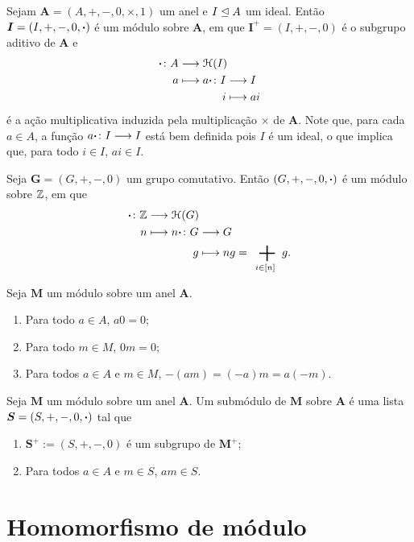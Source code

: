 \begin{example}
Sejam $\bm A=(A,+,-,0,\times,1)$ um anel e $I \mathrel{\unlhd} A$ um ideal. Então $\bm I = (I,+,-,0,\bm{\cdot})$ é um módulo sobre $\bm A$, em que $\bm I^+ = (I,+,-,0)$ é o subgrupo aditivo de $\bm A$ e
	\begin{align*}
	\func{\pt}{A}{\Homo(I)}{a}{
		\begin{aligned}[t]
			\func{a \pt}{I}{I}{i}{ai}
		\end{aligned}
	}
	\end{align*}
é a ação multiplicativa induzida pela multiplicação $\times$ de $\bm A$. Note que, para cada $a \in A$, a função ${a \bm{\cdot}}\colon {I} \longrightarrow {I}$ está bem definida pois $I$ é um ideal, o que implica que, para todo $i \in I$, $ai \in I$.
\end{example}
	
\begin{example}
Seja $\bm G=(G,+,-,0)$ um grupo comutativo. Então $(G,+,-,0,\bm{\cdot})$ é um módulo sobre $\mathbb{Z}$, em que
	\begin{align*}
	\func{\pt}{\Z}{\Homo(G)}{n}{
		\begin{aligned}[t]
			\func{n \pt}{G}{G}{g}{ng=\sum_{i \in [n]} g}.
		\end{aligned}
	}
	\end{align*}
\end{example}

\begin{exercise}
Seja $\bm M$ um módulo sobre um anel $\bm A$.
	\begin{enumerate}
	\item Para todo $a \in A$, $a0=0$;
	\item Para todo $m \in M$, $0m=0$;
	\item Para todos $a \in A$ e $m \in M$, $-(am)=(-a)m=a(-m)$.
	\end{enumerate}
\end{exercise}

\begin{definition}
Seja $\bm M$ um módulo sobre um anel $\bm A$. Um submódulo de $\bm M$ sobre $\bm A$ é uma lista $\bm S = (S,+,-,0,\bm{\cdot})$ tal que
	\begin{enumerate}
	\item $\bm S^+ := (S,+,-,0)$ é um subgrupo de $\bm M^+$;
	\item Para todos $a \in A$ e $m \in S$, $am \in S$.
	\end{enumerate}
\end{definition}

\section{Homomorfismo de módulo}

